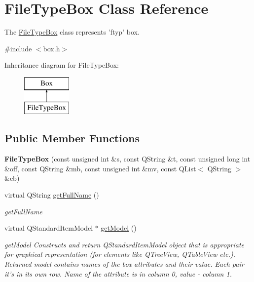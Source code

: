 \hypertarget{class_file_type_box}{\section{File\-Type\-Box Class Reference}
\label{class_file_type_box}
}


The \hyperlink{class_file_type_box}{File\-Type\-Box} class represents 'ftyp' box.  




{\ttfamily \#include $<$box.\-h$>$}

Inheritance diagram for File\-Type\-Box\-:\begin{figure}[H]
\begin{center}
\leavevmode
\includegraphics[height=2.000000cm]{class_file_type_box}
\end{center}
\end{figure}
\subsection*{Public Member Functions}
\begin{DoxyCompactItemize}
\item 
\hypertarget{class_file_type_box_a8bd14d72fb2d777ce82432343cf3b68a}{{\bfseries File\-Type\-Box} (const unsigned int \&s, const Q\-String \&t, const unsigned long int \&off, const Q\-String \&mb, const unsigned int \&mv, const Q\-List$<$ Q\-String $>$ \&cb)}\label{class_file_type_box_a8bd14d72fb2d777ce82432343cf3b68a}

\item 
virtual Q\-String \hyperlink{class_file_type_box_a680e45fdfe39b2e23ff46fc9f32153eb}{get\-Full\-Name} ()
\begin{DoxyCompactList}\small\item\em get\-Full\-Name \end{DoxyCompactList}\item 
virtual Q\-Standard\-Item\-Model $\ast$ \hyperlink{class_file_type_box_a0d7a5d446140b1d10c9ab36233e87550}{get\-Model} ()
\begin{DoxyCompactList}\small\item\em get\-Model Constructs and return Q\-Standard\-Item\-Model object that is appropriate for graphical representation (for elements like Q\-Tree\-View, Q\-Table\-View etc.). Returned model contains names of the box attributes and their value. Each pair it's in its own row. Name of the attribute is in column 0, value -\/ column 1. \end{DoxyCompactList}\end{DoxyCompactItemize}
